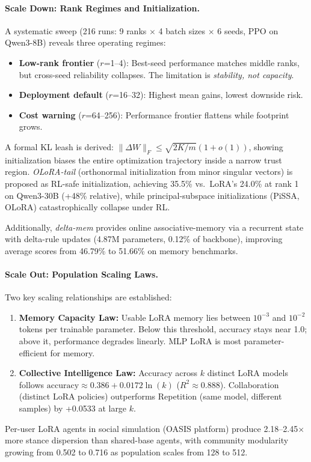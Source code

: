 \documentclass[11pt,a4paper]{article}
\begin{document}
\paragraph{Scale Down: Rank Regimes and Initialization.} A systematic sweep (216 runs: 9 ranks $\times$ 4 batch sizes $\times$ 6 seeds, PPO on Qwen3-8B) reveals three operating regimes:
\begin{itemize}
\item \textbf{Low-rank frontier} ($r$=1--4): Best-seed performance matches middle ranks, but cross-seed reliability collapses. The limitation is \emph{stability, not capacity}.
\item \textbf{Deployment default} ($r$=16--32): Highest mean gains, lowest downside risk.
\item \textbf{Cost warning} ($r$=64--256): Performance frontier flattens while footprint grows.
\end{itemize}
A formal KL leash is derived: $\|\Delta W\|_F \leq \sqrt{2K/m}(1 + o(1))$, showing initialization biases the entire optimization trajectory inside a narrow trust region. \emph{OLoRA-tail} (orthonormal initialization from minor singular vectors) is proposed as RL-safe initialization, achieving 35.5\% vs.\ LoRA's 24.0\% at rank 1 on Qwen3-30B (+48\% relative), while principal-subspace initializations (PiSSA, OLoRA) catastrophically collapse under RL.

Additionally, \emph{delta-mem} provides online associative-memory via a recurrent state with delta-rule updates (4.87M parameters, 0.12\% of backbone), improving average scores from 46.79\% to 51.66\% on memory benchmarks.

\paragraph{Scale Out: Population Scaling Laws.} Two key scaling relationships are established:
\begin{enumerate}
\item \textbf{Memory Capacity Law:} Usable LoRA memory lies between $10^{-3}$ and $10^{-2}$ tokens per trainable parameter. Below this threshold, accuracy stays near 1.0; above it, performance degrades linearly. MLP LoRA is most parameter-efficient for memory.
\item \textbf{Collective Intelligence Law:} Accuracy across $k$ distinct LoRA models follows $\mathrm{accuracy} \approx 0.386 + 0.0172\ln(k)$ ($R^2 \approx 0.888$). Collaboration (distinct LoRA policies) outperforms Repetition (same model, different samples) by +0.0533 at large $k$.
\end{enumerate}
Per-user LoRA agents in social simulation (OASIS platform) produce 2.18--2.45$\times$ more stance dispersion than shared-base agents, with community modularity growing from 0.502 to 0.716 as population scales from 128 to 512.
\end{document}
